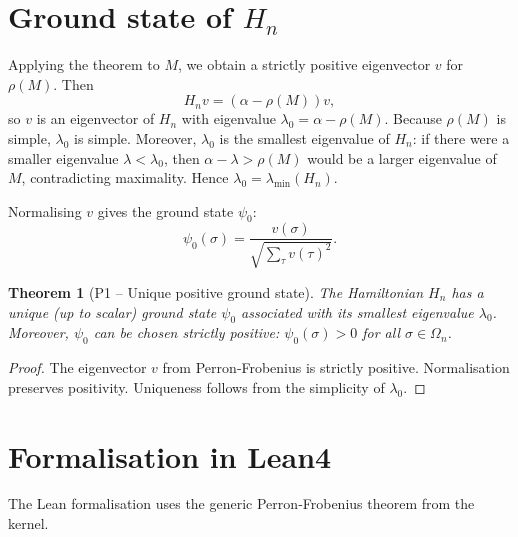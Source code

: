 \documentclass[11pt,a4paper]{article}
\newtheorem{theorem}{Theorem}[section]
\begin{document}
\section{Ground state of \(H_n\)}

Applying the theorem to \(M\), we obtain a strictly positive eigenvector \(v\) for \(\rho(M)\). Then
\[
H_n v = (\alpha - \rho(M)) v,
\]
so \(v\) is an eigenvector of \(H_n\) with eigenvalue \(\lambda_0 = \alpha - \rho(M)\). Because \(\rho(M)\) is simple, \(\lambda_0\) is simple. Moreover, \(\lambda_0\) is the smallest eigenvalue of \(H_n\): if there were a smaller eigenvalue \(\lambda < \lambda_0\), then \(\alpha - \lambda > \rho(M)\) would be a larger eigenvalue of \(M\), contradicting maximality. Hence \(\lambda_0 = \lambda_{\min}(H_n)\).

Normalising \(v\) gives the ground state \(\psi_0\):
\[
\psi_0(\sigma) = \frac{v(\sigma)}{\sqrt{\sum_{\tau} v(\tau)^2}}.
\]

\begin{theorem}[P1 – Unique positive ground state]
The Hamiltonian \(H_n\) has a unique (up to scalar) ground state \(\psi_0\) associated with its smallest eigenvalue \(\lambda_0\). Moreover, \(\psi_0\) can be chosen strictly positive: \(\psi_0(\sigma) > 0\) for all \(\sigma\in\Omega_n\).
\end{theorem}
\begin{proof}
The eigenvector \(v\) from Perron‑Frobenius is strictly positive. Normalisation preserves positivity. Uniqueness follows from the simplicity of \(\lambda_0\).
\end{proof}

\section{Formalisation in Lean4}

The Lean formalisation uses the generic Perron‑Frobenius theorem from the kernel.
\end{document}
